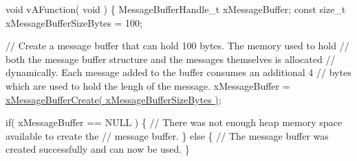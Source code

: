 \begin{DoxyPre}void vAFunction( void )
\{
MessageBufferHandle\_t xMessageBuffer;
const size\_t xMessageBufferSizeBytes = 100;\end{DoxyPre}



\begin{DoxyPre} // Create a message buffer that can hold 100 bytes.  The memory used to hold
 // both the message buffer structure and the messages themselves is allocated
 // dynamically.  Each message added to the buffer consumes an additional 4
 // bytes which are used to hold the lengh of the message.
 xMessageBuffer = \hyperlink{message__buffer_8h_a2959cd0e3d2bd20d46908e5c9872be36}{xMessageBufferCreate( xMessageBufferSizeBytes )};\end{DoxyPre}



\begin{DoxyPre} if( xMessageBuffer == NULL )
 \{
     // There was not enough heap memory space available to create the
     // message buffer.
 \}
 else
 \{
     // The message buffer was created successfully and can now be used.
 \}\end{DoxyPre}



\begin{DoxyPre}\end{DoxyPre}
 